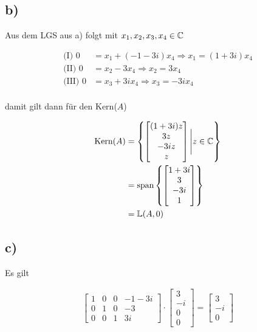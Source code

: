 \documentclass[a4paper, 11pt]{article}
\begin{document}
\subsection{b)}
\label{sec:org838b339}
Aus dem LGS aus a) folgt mit \(x_1, x_2, x_3, x_4 \in \mathbb{C}\)

\begin{align*}
    \text{(I)  } 0 &= x_1 + (-1 - 3i)x_4 \Rightarrow x_1 = (1 + 3i)x_4 \\
    \text{(II)  } 0 &= x_2 - 3 x_4 \Rightarrow             x_2 = 3 x_4 \\
    \text{(III)  } 0 &= x_3 + 3i x_4 \Rightarrow         x_3 = -3i x_4 \\
\end{align*}

damit gilt dann für den Kern(\(A\))

\begin{align*}
    \text{Kern}(A) &= \left\{ \begin{bmatrix} (1 + 3i)z \\ 3 z \\ -3i z \\ z \end{bmatrix} \Bigg| z \in \mathbb{C} \right\} \\
    &= \text{span} \left\{ \begin{bmatrix} 1 + 3i \\ 3 \\ -3i \\ 1 \end{bmatrix} \right\} \\
    &= \mathbb{L}(A, 0)
\end{align*} 

\subsection{c)}
\label{sec:org360b326}
Es gilt

\begin{align*}
    \begin{bmatrix}
        1 & 0 & 0 & -1-3i \\
        0 & 1 & 0 & -3 \\
        0 & 0 & 1 & 3i
    \end{bmatrix} \cdot
    \begin{bmatrix}
        3 \\
        -i \\
        0 \\
        0
    \end{bmatrix} = \begin{bmatrix} 3 \\ -i \\ 0 \end{bmatrix}
\end{align*}
\end{document}

